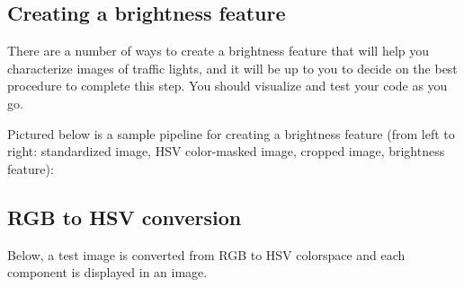 \documentclass[11pt]{article}
\begin{document}
    \hypertarget{creating-a-brightness-feature}{%
\subsection{Creating a brightness
feature}\label{creating-a-brightness-feature}}

There are a number of ways to create a brightness feature that will help
you characterize images of traffic lights, and it will be up to you to
decide on the best procedure to complete this step. You should visualize
and test your code as you go.

Pictured below is a sample pipeline for creating a brightness feature
(from left to right: standardized image, HSV color-masked image, cropped
image, brightness feature):

    \hypertarget{rgb-to-hsv-conversion}{%
\subsection{RGB to HSV conversion}\label{rgb-to-hsv-conversion}}

Below, a test image is converted from RGB to HSV colorspace and each
component is displayed in an image.
\end{document}
